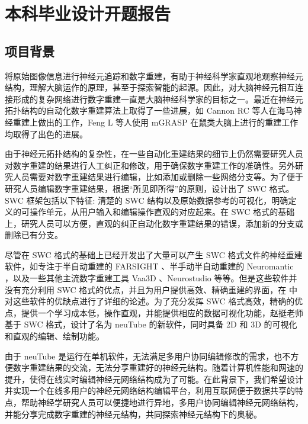 \thispagestyle{empty}
{
\chapter{本科毕业设计开题报告}

\section{项目背景}
将原始图像信息进行神经元追踪和数字重建，有助于神经科学家直观地观察神经元结构，理解大脑运作的原理，甚至于探索智能的起源。因此，对大脑神经元相互连接形成的复杂网络进行数字重建一直是大脑神经科学家的目标之一。最近在神经元拓扑结构的自动化数字重建算法上取得了一些进展，如 Cannon RC 等人在海马神经重建上做出的工作\cite{Cannon1998An}，Feng L 等人使用 mGRASP 在鼠类大脑上进行的重建工作\cite{Druckmann2014Structured}均取得了出色的进展。

由于神经元拓扑结构的复杂性，在一些自动化重建结果的细节上仍然需要研究人员对数字重建的结果进行人工纠正和修改，用于确保数字重建工作的准确性。另外研究人员需要对数字重建结果进行编辑，比如添加或删除一些网络分支等。为了便于研究人员编辑数字重建结果，根据“所见即所得”的原则，设计出了 SWC 格式\cite{Peng2011Proof}。SWC 框架包括以下特征: 清楚的 SWC 结构以及原始数据参考的可视化，明确定义的可操作单元，从用户输入和编辑操作直观的对应起来。在 SWC 格式的基础上，研究人员可以方便，直观的纠正自动化数字重建结果的错误，添加新的分支或删除已有分支。

尽管在 SWC 格式的基础上已经开发出了大量可以产生 SWC 格式文件的神经重建软件，如专注于半自动重建的 FARSIGHT \cite{Luisi2011The}、半手动半自动重建的 Neuromantic \cite{Myatt2012Neuromantic}，以及一些其他主流数字重建工具 Vaa3D \cite{Peng2010Seeing}、Neurostudio \cite{Rodriguez2006Rayburst} 等等。但是这些软件并没有充分利用 SWC 格式的优点，并且为用户提供高效、精确重建的界面，在 \cite{Feng2014neuTube} 中对这些软件的优缺点进行了详细的论述。为了充分发挥 SWC 格式高效，精确的优点，提供一个学习成本低，操作直观，并能提供相应的数据可视化功能，赵挺老师基于 SWC 格式，设计了名为 neuTube 的新软件\cite{Feng2014neuTube}，同时具备 2D 和 3D 的可视化和直观的编辑、绘制功能。

由于 neuTube 是运行在单机软件，无法满足多用户协同编辑修改的需求，也不方便数字重建结果的交流，无法分享重建好的神经元结构。随着计算机性能和网速的提升，使得在线实时编辑神经元网络结构成为了可能。在此背景下，我们希望设计并实现一个在线多用户的神经元网络结构编辑平台，利用互联网便于数据共享的特点，帮助神经学研究人员可以便捷地进行异地，多用户协同编辑神经元网络结构，并能分享完成数字重建的神经元结构，共同探索神经元结构下的奥秘。

}
